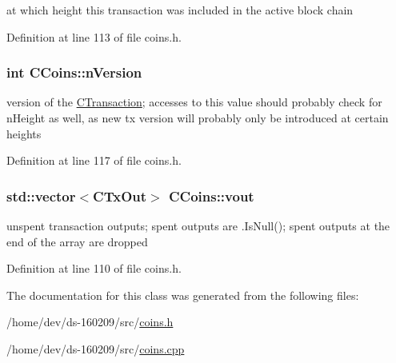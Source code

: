 at which height this transaction was included in the active block chain 



Definition at line 113 of file coins.\+h.

\hypertarget{class_c_coins_a96fea4ee8841e9ce32f60c2e7e3cf6b6}{}
\subsubsection[{n\+Version}]{\setlength{\rightskip}{0pt plus 5cm}int C\+Coins\+::n\+Version}\label{class_c_coins_a96fea4ee8841e9ce32f60c2e7e3cf6b6}
version of the \hyperlink{class_c_transaction}{C\+Transaction}; accesses to this value should probably check for n\+Height as well, as new tx version will probably only be introduced at certain heights 

Definition at line 117 of file coins.\+h.

\hypertarget{class_c_coins_a1dcea1a6da9b25642337e286f9f59b03}{}
\subsubsection[{vout}]{\setlength{\rightskip}{0pt plus 5cm}std\+::vector$<${\bf C\+Tx\+Out}$>$ C\+Coins\+::vout}\label{class_c_coins_a1dcea1a6da9b25642337e286f9f59b03}


unspent transaction outputs; spent outputs are .Is\+Null(); spent outputs at the end of the array are dropped 



Definition at line 110 of file coins.\+h.



The documentation for this class was generated from the following files\+:\begin{DoxyCompactItemize}
\item 
/home/dev/ds-\/160209/src/\hyperlink{coins_8h}{coins.\+h}\item 
/home/dev/ds-\/160209/src/\hyperlink{coins_8cpp}{coins.\+cpp}\end{DoxyCompactItemize}
